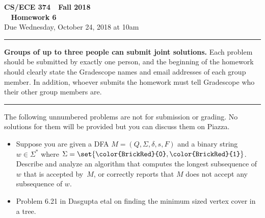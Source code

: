 \documentclass[11pt]{article}
\def\Sym#1{\texttt{\upshape\textcolor{BrickRed}{#1}}}
\def\Sym#1{\texttt{\upshape \color{BrickRed} {#1}}}
\begin{document}

\thispagestyle{empty}

\begin{center}
\Large\textbf{CS/ECE 374 \,\decosix\,  Fall 2018}%
\\
\LARGE\textbf{\decothreeleft~ Homework 6 ~\decothreeright}%
\\[0.5ex]
\large Due Wednesday, October 24, 2018 at 10am
\end{center}

\bigskip
\hrule
\bigskip

\noindent
\textbf{Groups of up to three people can submit joint solutions.}
Each problem should be submitted by exactly one person, and the
beginning of the homework should clearly state the Gradescope names
and email addresses of each group member.  In addition, whoever
submits the homework must tell Gradescope who their other group
members are.
\bigskip \hrule \bigskip

\noindent
The following unnumbered problems are not for submission or grading. 
No solutions for them will be provided but you can discuss them on Piazza.
\begin{itemize}
\item Suppose you are given a DFA $M = (Q, \Sigma, \delta, s, F)$ and
   a binary string $w\in \Sigma^*$ where $\Sigma = \set{\Sym0,\Sym1}$.
   Describe and analyze an algorithm that computes the longest
   subsequence of~$w$ that is accepted by~$M$, or correctly reports
   that $M$ does not accept any subsequence of $w$.


\item Problem 6.21 in Dasgupta etal on finding the minimum sized vertex cover
in a tree.
\end{itemize}

\vspace{1cm}
\end{document}
